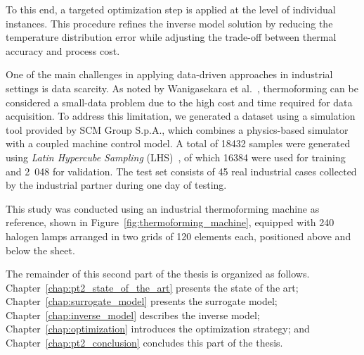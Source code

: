 To this end, a targeted optimization step is applied at the level of individual instances. This procedure refines the inverse model solution by reducing the temperature distribution error while adjusting the trade-off between thermal accuracy and process cost.

One of the main challenges in applying data-driven approaches in industrial settings is data scarcity. As noted by Wanigasekara et al.~\cite{wanigasekara2021machine}, thermoforming can be considered a small-data problem due to the high cost and time required for data acquisition. To address this limitation, we generated a dataset using a simulation tool provided by SCM Group S.p.A., which combines a physics-based simulator with a coupled machine control model. A total of \num{18432} samples were generated using \emph{Latin Hypercube Sampling} (LHS)~\cite{loh1996latin}, of which \num{16384} were used for training and 2~048 for validation. The test set consists of 45 real industrial cases collected by the industrial partner during one day of testing.

This study was conducted using an industrial thermoforming machine as reference, shown in Figure~\ref{fig:thermoforming_machine}, equipped with 240 halogen lamps arranged in two grids of 120 elements each, positioned above and below the sheet.

The remainder of this second part of the thesis is organized as follows. Chapter~\ref{chap:pt2_state_of_the_art} presents the state of the art; Chapter~\ref{chap:surrogate_model} presents the surrogate model; Chapter~\ref{chap:inverse_model} describes the inverse model; Chapter~\ref{chap:optimization} introduces the optimization strategy; and Chapter~\ref{chap:pt2_conclusion} concludes this part of the thesis.
